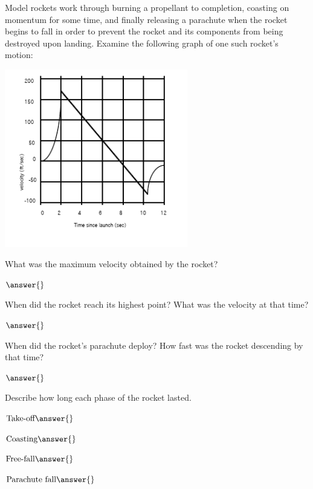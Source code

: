 \documentclass{ximera}
\begin{document}
\begin{question}
Model rockets work through burning a propellant to completion, coasting on momentum for some time, and finally releasing a parachute when the rocket begins to fall in order to prevent the rocket and its components from being destroyed upon landing. Examine the following graph of one such rocket's motion:
\begin{image}
    \includegraphics[width=80mm]{rocket.png}
\end{image}

What was the maximum velocity obtained by the rocket?

$\answer{}$

When did the rocket reach its highest point? What was the velocity at that time?

$\answer{}$

When did the rocket's parachute deploy? How fast was the rocket descending by that time?

$\answer{}$

Describe how long each phase of the rocket lasted.

$\text{Take-off} \answer{}$

$\text{Coasting} \answer{}$

$\text{Free-fall} \answer{}$

$\text{Parachute fall} \answer{}$
\end{question}
\end{document}
